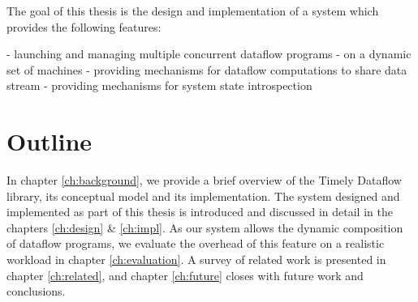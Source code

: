 The goal of this thesis is the design and implementation of a system which
provides the following features:

- launching and managing multiple concurrent dataflow programs
- on a dynamic set of machines
- providing mechanisms for dataflow computations to share data stream
- providing mechanisms for system state introspection

\section{Outline}

In chapter \ref{ch:background}, we provide a brief overview of
the Timely Dataflow library, its conceptual model and its implementation. The
system designed and implemented as part of this thesis is introduced and
discussed in detail in the chapters \ref{ch:design} \& \ref{ch:impl}. As our
system allows the dynamic composition of dataflow programs, we evaluate the
overhead of this feature on a realistic workload in chapter \ref{ch:evaluation}.
A survey of related work is presented in chapter \ref{ch:related}, and chapter
\ref{ch:future} closes with future work and conclusions.
